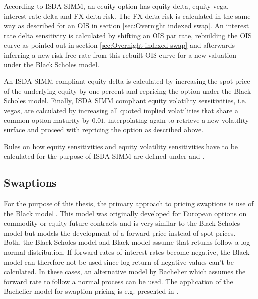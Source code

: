 \documentclass[../Thesis_AHoecherl.tex]{subfiles}
\begin{document}
    According to \gls{ISDA SIMM}, an equity option has equity delta, equity vega, interest rate delta and FX delta risk. The FX delta risk is calculated in the same way as described for an \gls{OIS} in section \ref{sec:Overnight indexed swap}.
    An interest rate delta sensitivity is calculated by shifting an \gls{OIS} par rate, rebuilding the \gls{OIS} curve as pointed out in section \ref{sec:Overnight indexed swap} and afterwards inferring a new risk free rate from this rebuilt \gls{OIS} curve for a new valuation under the Black Scholes model.

    An \gls{ISDA SIMM} compliant equity delta is calculated by increasing the spot price of the underlying equity by one percent and repricing the option under the Black Scholes model.
    Finally, \gls{ISDA SIMM} compliant equity volatility sensitivities, i.e. vegas, are calculated by increasing all quoted implied volatilities that share a common option maturity by $0.01$, interpolating again to retrieve a new volatility surface and proceed with repricing the option as described above.

    Rules on how equity sensitivities and equity volatility sensitivities have to be calculated for the purpose of \gls{ISDA SIMM} are defined under \cite[Section 2.5 and 2.8]{RiskDataStandard} and \cite[Points 21, 26 and section C.3]{SIMM}.

    \subsection{Swaptions}

    For the purpose of this thesis, the primary approach to pricing swaptions is use of the Black model \cite{black1976pricing}. This model was originally developed for European options on commodity or equity future contracts and is very similar to the Black-Scholes model but models the development of a forward price instead of spot prices.
    Both, the Black-Scholes model and Black model assume that returns follow a log-normal distribution.
    If forward rates of interest rates become negative, the Black model can therefore not be used since log return of negative values can't be calculated.
    In these cases, an alternative model by Bachelier \cite{bachelier1990theorie} which assumes the forward rate to follow a normal process can be used.
    The application of the Bachelier model for swaption pricing is e.g. presented in \cite{floc2016fast}.
\end{document}
